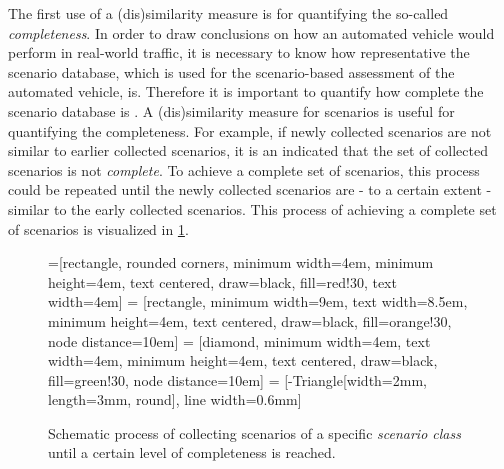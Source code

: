 \documentclass[10pt,final,a4paper,oneside,onecolumn]{article}
\theoremstyle{plain}\newtheorem{definition}{Definition}[section]    %
\theoremstyle{definition}\newtheorem{example}{Example}[section]     %
\theoremstyle{remark}\newtheorem{remarkenv}{Remark}[section]        %
\begin{document}
The first use of a (dis)similarity measure is for quantifying the so-called \emph{completeness}. In order to draw conclusions on how an automated vehicle would perform in real-world traffic, it is necessary to know how representative the scenario database, which is used for the scenario-based assessment of the automated vehicle, is. Therefore it is important to quantify how complete the scenario database is \cite{geyer2014, alvarez2017prospective, stellet2015taxonomy}. A (dis)similarity measure for scenarios is useful for quantifying the completeness. For example, if newly collected scenarios are not similar to earlier collected scenarios, it is an indicated that the set of collected scenarios is not \emph{complete}. To achieve a complete set of scenarios, this process could be repeated until the newly collected scenarios are - to a certain extent - similar to the early collected scenarios. This process of achieving a complete set of scenarios is visualized in \cref{fig:completeness collection}.

\begin{figure}[b]
	\centering
	=[rectangle, rounded corners, minimum width=4em, minimum height=4em, text centered, draw=black, fill=red!30, text width=4em]
	 = [rectangle, minimum width=9em, text width=8.5em, minimum height=4em, text centered, draw=black, fill=orange!30, node distance=10em]
	 = [diamond, minimum width=4em, text width=4em, minimum height=4em, text centered, draw=black, fill=green!30, node distance=10em]
	 = [-{Triangle[width=2mm, length=3mm, round]}, line width=0.6mm] %
	\caption{Schematic process of collecting scenarios of a specific \emph{scenario class} until a certain level of completeness is reached.}
	\label{fig:completeness collection}
\end{figure}
\end{document}
